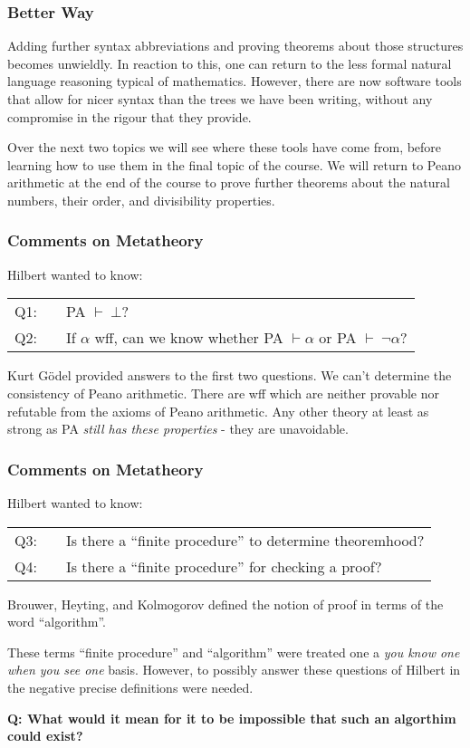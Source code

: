 \documentclass{beamer}
\theoremstyle{indentDefn} \newtheorem{defn}[]{Definition}
\begin{document}
\begin{frame}
	\frametitle{Better Way}

	Adding further syntax abbreviations and proving theorems about those structures becomes unwieldly. In reaction to this, one can return to the less formal natural language reasoning typical of mathematics. However, there are now software tools that allow for nicer syntax than the trees we have been writing, without any compromise in the rigour that they provide. 

	Over the next two topics we will see where these tools have come from, before learning how to use them in the final topic of the course. We will return to Peano arithmetic at the end of the course to prove further theorems about the natural numbers, their order, and divisibility properties. 

\end{frame}

\begin{frame}
	\frametitle{Comments on Metatheory}

	Hilbert wanted to know: 

	\begin{tabular}{r c l}
		Q1: & & PA $\vdash \ \bot$? \\
		Q2: & & If $\alpha$ wff, can we know whether PA $\vdash \alpha$ or PA $\vdash \ \lnot \alpha$?
	\end{tabular}		

	Kurt G\"{o}del provided answers to the first two questions. We can't determine the consistency of Peano arithmetic. There are wff which are neither provable nor refutable from the axioms of Peano arithmetic. Any other theory at least as strong as PA \emph{still has these properties} - they are unavoidable.

\end{frame}

\begin{frame}
	\frametitle{Comments on Metatheory}
	Hilbert wanted to know:

	\begin{tabular}{r c l}
		Q3: & & Is there a ``finite procedure'' to determine theoremhood? \\
		Q4: & & Is there a ``finite procedure'' for checking a proof? 
	\end{tabular}

	Brouwer, Heyting, and Kolmogorov defined the notion of proof in terms of the word ``algorithm''.
	
	These terms ``finite procedure'' and ``algorithm'' were treated one a \emph{you know one when you see one} basis. However, to possibly answer these questions of Hilbert in the negative precise definitions were needed. 

	{\bf Q: What would it mean for it to be impossible that such an algorthim could exist?}
\end{frame}
\end{document}
